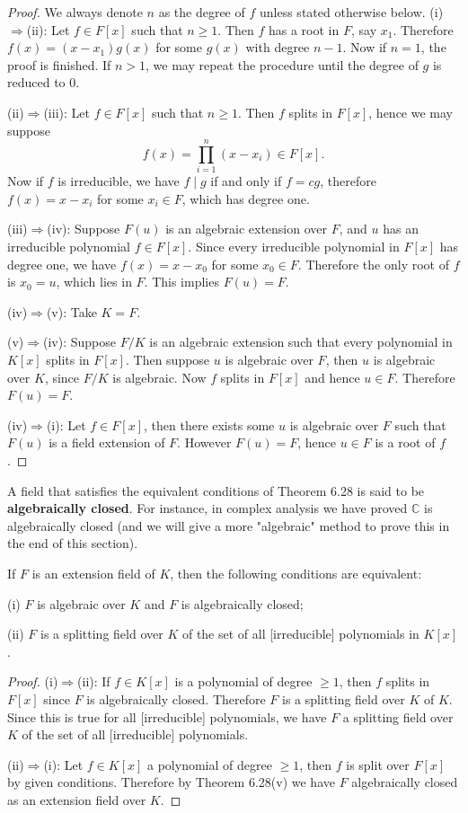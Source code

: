 \begin{proof}
We always denote $n$ as the degree of $f$ unless stated otherwise below.
(i)$\Rightarrow$(ii): Let $f\in F[x]$ such that $n\ge 1$. Then $f$ has a root in $F$, say $x_1$. Therefore $f(x)=(x-x_1)g(x)$ for some $g(x)$ with degree $n-1$. Now if $n=1$, the proof is finished. If $n>1$, we may repeat the procedure until the degree of $g$ is reduced to $0$.\par
(ii)$\Rightarrow$(iii): Let $f\in F[x]$ such that $n\ge 1$. Then $f$ splits in $F[x]$, hence we may suppose 
$$
f\left( x \right) =\prod_{i=1}^n{\left( x-x_i \right)}\in F\left[ x \right] .
$$
Now if $f$ is irreducible, we have $f\mid g$ if and only if $f=cg$, therefore $f(x)=x-x_i$ for some $x_i\in F$, which has degree one.\par
(iii)$\Rightarrow$(iv): Suppose $F(u)$ is an algebraic extension over $F$, and $u$ has an irreducible polynomial $f\in F[x]$. Since every irreducible polynomial in $F[x]$ has degree one, we have $f(x)=x-x_0$ for some $x_0\in F$. Therefore the only root of $f$ is $x_0=u$, which lies in $F$. This implies $F(u)=F$.\par
(iv)$\Rightarrow$(v): Take $K=F$.\par
(v)$\Rightarrow$(iv): Suppose $F/K$ is an algebraic extension such that every polynomial in $K[x]$ splits in $F[x]$. Then suppose $u$ is algebraic over $F$, then $u$ is algebraic over $K$, since $F/K$ is algebraic. Now $f$ splits in $F[x]$ and hence $u\in F$. Therefore $F(u)=F$.\par
(iv)$\Rightarrow$(i): Let $f\in F[x]$, then there exists some $u$ is algebraic over $F$ such that $F(u)$ is a field extension of $F$. However $F(u)=F$, hence $u\in F$ is a root of $f$.
\end{proof}
A field that satisfies the equivalent conditions of Theorem 6.28 is said to be \textbf{algebraically closed}. For instance, in complex analysis we have proved $\mathbb{C}$ is algebraically closed (and we will give a more "algebraic" method to prove this in the end of this section).
\begin{theorem}
If $F$ is an extension field of $K$, then the following conditions are equivalent: \par
(i) $F$ is algebraic over $K$ and $F$ is algebraically closed;\par
(ii) $F$ is a splitting field over $K$ of the set of all [irreducible] polynomials in $K[x]$.
\end{theorem}
\begin{proof}
(i)$\Rightarrow$(ii): If $f\in K[x]$ is a polynomial of degree $\ge 1$, then $f$ splits in $F[x]$ since $F$ is algebraically closed. Therefore $F$ is a splitting field over $K$ of $K$. Since this is true for all [irreducible] polynomials, we have $F$ a splitting field over $K$ of the set of all [irreducible] polynomials.\par
(ii)$\Rightarrow$(i): Let $f\in K[x]$ a polynomial of degree $\ge 1$, then $f$ is split over $F[x]$ by given conditions. Therefore by Theorem 6.28(v) we have $F$ algebraically closed as an extension field over $K$.
\end{proof}

